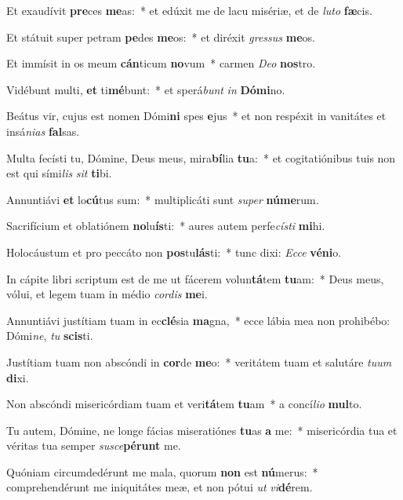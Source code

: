 \item Et exaudívit \textbf{pre}ces \textbf{me}as:~* et edúxit me de lacu misériæ, et de \textit{lu}\textit{to} \textbf{fæ}cis.
\item Et státuit super petram \textbf{pe}des \textbf{me}os:~* et diréxit \textit{gres}\textit{sus} \textbf{me}os.
\item Et immísit in os meum \textbf{cán}ticum \textbf{no}vum~* carmen \textit{De}\textit{o} \textbf{nos}tro.
\item Vidébunt multi, \textbf{et} ti\textbf{mé}bunt:~* et sperá\textit{bunt} \textit{in} \textbf{Dó}\textbf{mi}no.
\item Beátus vir, cujus est nomen Dómi\textbf{ni} spes \textbf{e}jus~* et non respéxit in vanitátes et insá\textit{ni}\textit{as} \textbf{fal}sas.
\item Multa fecísti tu, Dómine, Deus meus, mira\textbf{bí}lia \textbf{tu}a:~* et cogitatiónibus tuis non est qui sími\textit{lis} \textit{sit} \textbf{ti}bi.
\item Annuntiávi \textbf{et} lo\textbf{cú}tus sum:~* multiplicáti sunt \textit{su}\textit{per} \textbf{nú}\textbf{me}rum.
\item Sacrifícium et oblatiónem \textbf{no}lu\textbf{ís}ti:~* aures autem perfe\textit{cís}\textit{ti} \textbf{mi}hi.
\item Holocáustum et pro peccáto non \textbf{pos}tu\textbf{lás}ti:~* tunc dixi: \textit{Ec}\textit{ce} \textbf{vé}\textbf{ni}o.
\item In cápite libri scriptum est de me ut fácerem volun\textbf{tá}tem \textbf{tu}am:~* Deus meus, vólui, et legem tuam in médio \textit{cor}\textit{dis} \textbf{me}i.
\item Annuntiávi justítiam tuam in ec\textbf{clé}sia \textbf{ma}gna,~* ecce lábia mea non prohibébo: Dómi\textit{ne}, \textit{tu} \textbf{scis}ti.
\item Justítiam tuam non abscóndi in \textbf{cor}de \textbf{me}o:~* veritátem tuam et salutáre \textit{tu}\textit{um} \textbf{di}xi.
\item Non abscóndi misericórdiam tuam et veri\textbf{tá}tem \textbf{tu}am~* a concí\textit{li}\textit{o} \textbf{mul}to.
\item Tu autem, Dómine, ne longe fácias miseratiónes \textbf{tu}as \textbf{a} me:~* misericórdia tua et véritas tua semper \textit{su}\textit{sce}\textbf{pé}\textbf{runt} me.
\item Quóniam circumdedérunt me mala, quorum \textbf{non} est \textbf{nú}merus:~* comprehendérunt me iniquitátes meæ, et non pótui \textit{ut} \textit{vi}\textbf{dé}rem.

